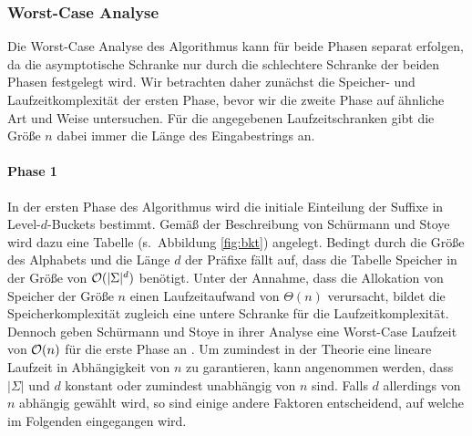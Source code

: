 \subsubsection{Worst-Case Analyse}
\label{bpr:effizienz:theorie}

Die Worst-Case Analyse des Algorithmus kann für beide Phasen separat erfolgen, da die asymptotische Schranke nur durch die schlechtere Schranke der beiden Phasen festgelegt wird. Wir betrachten daher zunächst die Speicher- und Laufzeitkomplexität der ersten Phase, bevor wir die zweite Phase auf ähnliche Art und Weise untersuchen. Für die angegebenen Laufzeitschranken gibt die Größe \(n\) dabei immer die Länge des Eingabestrings an.
\paragraph*{Phase 1}
In der ersten Phase des Algorithmus wird die initiale Einteilung der Suffixe in Level-\(d\)-Buckets bestimmt. Gemäß der Beschreibung von Schürmann und Stoye \cite[Abschnitt 3.3]{saca:2} wird dazu eine Tabelle \bkt (s.~Abbildung \ref{fig:bkt}) angelegt. Bedingt durch die Größe des Alphabets und die Länge \(d\) der Präfixe fällt auf, dass die Tabelle Speicher in der Größe von \(\mathcal{O}(|\Sigma|^d)\) benötigt. Unter der Annahme, dass die Allokation von Speicher der Größe \(n\) einen Laufzeitaufwand von \(\Theta(n)\) verursacht, bildet die Speicherkomplexität zugleich eine untere Schranke für die Laufzeitkomplexität. Dennoch geben Schürmann und Stoye in ihrer Analyse eine Worst-Case Laufzeit von \(\mathcal{O}(n)\) für die erste Phase an \cite[Kapitel 3.2]{saca:2}. Um zumindest in der Theorie eine lineare Laufzeit in Abhängigkeit von \(n\) zu garantieren, kann angenommen werden, dass \(|\Sigma|\) und \(d\) konstant oder zumindest unabhängig von \(n\) sind. Falls \(d\) allerdings von \(n\) abhängig gewählt wird, so sind einige andere Faktoren entscheidend, auf welche im Folgenden eingegangen wird.\par
